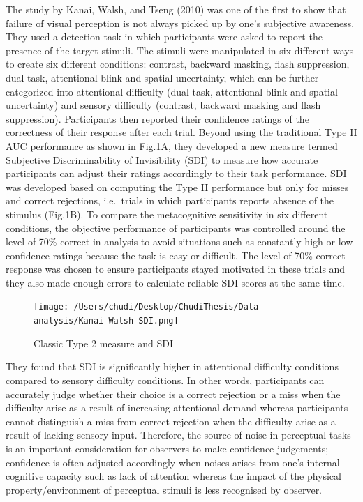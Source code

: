 \documentclass[
]{article}
\begin{document}
The study by Kanai, Walsh, and Tseng (2010) was one of the first to show
that failure of visual perception is not always picked up by one's
subjective awareness. They used a detection task in which participants
were asked to report the presence of the target stimuli. The stimuli
were manipulated in six different ways to create six different
conditions: contrast, backward masking, flash suppression, dual task,
attentional blink and spatial uncertainty, which can be further
categorized into attentional difficulty (dual task, attentional blink
and spatial uncertainty) and sensory difficulty (contrast, backward
masking and flash suppression). Participants then reported their
confidence ratings of the correctness of their response after each
trial. Beyond using the traditional Type II AUC performance as shown in
Fig.1A, they developed a new measure termed Subjective Discriminability
of Invisibility (SDI) to measure how accurate participants can adjust
their ratings accordingly to their task performance. SDI was developed
based on computing the Type II performance but only for misses and
correct rejections, i.e.~trials in which participants reports absence of
the stimulus (Fig.1B). To compare the metacognitive sensitivity in six
different conditions, the objective performance of participants was
controlled around the level of 70\% correct in analysis to avoid
situations such as constantly high or low confidence ratings because the
task is easy or difficult. The level of 70\% correct response was chosen
to ensure participants stayed motivated in these trials and they also
made enough errors to calculate reliable SDI scores at the same time.

\begin{figure}
\centering
\texttt{[image: /Users/chudi/Desktop/ChudiThesis/Data-analysis/Kanai Walsh SDI.png]}
\caption{Classic Type 2 measure and SDI}
\end{figure}

They found that SDI is significantly higher in attentional difficulty
conditions compared to sensory difficulty conditions. In other words,
participants can accurately judge whether their choice is a correct
rejection or a miss when the difficulty arise as a result of increasing
attentional demand whereas participants cannot distinguish a miss from
correct rejection when the difficulty arise as a result of lacking
sensory input. Therefore, the source of noise in perceptual tasks is an
important consideration for observers to make confidence judgements;
confidence is often adjusted accordingly when noises arises from one's
internal cognitive capacity such as lack of attention whereas the impact
of the physical property/environment of perceptual stimuli is less
recognised by observer.
\end{document}
